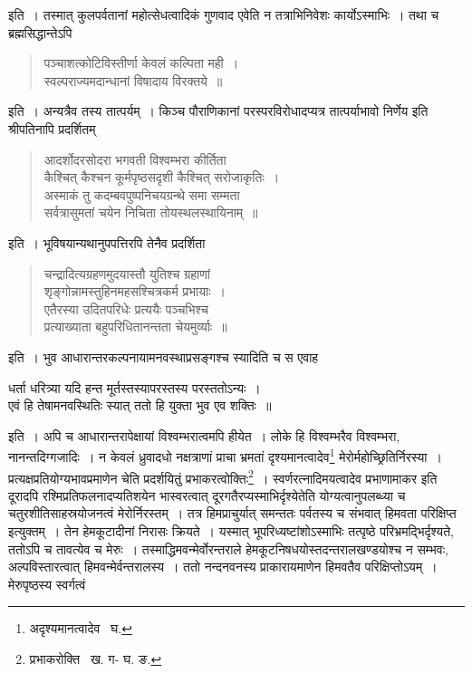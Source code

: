 \documentclass[11pt, openany]{book}
\begin{document}
\noindent इति~। तस्मात् कुलपर्वतानां महोत्सेधत्वादिकं गुणवाद एवेति न तत्राभिनिवेशः कार्योऽस्माभिः~। तथा च ब्रह्मसिद्धान्तेऽपि\textendash  
\begin{quote}
{\qt पञ्चाशत्कोटिविस्तीर्णा केवलं कल्पिता मही~। \\
स्वल्पराज्यमदान्धानां विषादाय विरक्तये~॥}
\end{quote}

\noindent इति~। अन्यत्रैव तस्य तात्पर्यम्~। किञ्च पौराणिकानां परस्परविरोधादप्यत्र तात्पर्याभावो निर्णेय इति श्रीपतिनापि प्रदर्शितम्\textendash 


\newpage

\begin{quote}
{\qt आदर्शोदरसोदरा भगवती विश्वम्भरा कीर्तिता \\
 कैश्चित् कैश्चन कूर्मपृष्ठसदृशी कैश्चित् सरोजाकृतिः~।\\
अस्माकं तु कदम्बवपुष्पनिचयग्रन्थे समा सम्मता\\
सर्वत्रासुमतां चयेन निचिता तोयस्थलस्थायिनाम्~॥}  
\end{quote}

\noindent इति~। भूविषयान्यथानुपपत्तिरपि तेनैव प्रदर्शिता\textendash  

\begin{quote}
{\qt चन्द्रादित्यग्रहणमुदयास्तौ युतिश्च ग्रहाणां \\
 शृङ्गोन्नामस्तुहिनमहसश्चित्रकर्म प्रभायाः~। \\
एतैरस्या उदितपरिधेः प्रत्ययैः पञ्चभिश्च \\
प्रत्याख्याता बहुपरिधितानन्तता चेयमुर्व्याः~॥} 
\end{quote}

इति~। भुव आधारान्तरकल्पनायामनवस्थाप्रसङ्गश्च स्यादिति च स एवाह\textendash  
\begin{center}
{\qt धर्ता धरित्र्या यदि हन्त मूर्तस्तस्यापरस्तस्य परस्ततोऽन्यः~।\\
एवं हि तेषामनवस्थितिः स्यात् ततो हि युक्ता भुव एव शक्तिः~॥}
\end{center}

इति~। अपि च आधारान्तरापेक्षायां विश्वम्भरात्वमपि हीयेत~। लोके हि विश्वम्भरैव विश्वम्भरा, नानन्तदिग्गजादिः~। न केवलं ध्रुवादधो 
नक्षत्राणां प्राचा भ्रमतां दृश्यमानत्वादेव\renewcommand{\thefootnote}{१}\footnote{अदृश्यमानत्वादेव \textendash\ घ.} मेरोर्महोच्छ्रितिर्निरस्या~। प्रत्यक्षप्रतियोग्यभावप्रमाणेन चेति प्रदर्शयितुं प्रभाकरत्वोक्तिः\renewcommand{\thefootnote}{२}\footnote{प्रभाकरोक्ति \textendash\ ख. ग- घ. ङ.}~। स्वर्णरत्नादिमयत्वादेव प्रभाणामाकर इति दूरादपि रश्मिप्रतिफलनादप्यतिशयेन भास्वरत्वात् दूरगतैरप्यस्माभिर्दृश्येतेति योग्यत्वानुपलब्ध्या च चतुरशीतिसाहस्रयोजनत्वं मेरोर्निरस्तम्~। तत्र हिमप्राचुर्यात् समन्ततः पर्वतस्य च संभवात् हिमवता परिक्षिप्त इत्युक्तम्~। तेन हेमकूटादीनां निरासः क्रियते~। यस्मात् भूपरिध्यष्टांशोऽस्माभिः तत्पृष्ठे परिभ्रमद्भिर्दृश्यते, ततोऽपि च तावत्येव च मेरुः~। तस्माद्धिमवन्मेर्वोरन्तराले हेमकूटनिषधयोस्तदन्तरालखण्डयोश्च न सम्भवः, अल्पविस्तारत्वात् हिमवन्मेर्वन्तरालस्य~। ततो नन्दनवनस्य प्राकारायमाणेन हिमवतैव परिक्षिप्तोऽयम्~। मेरुपृष्ठस्य स्वर्गत्वं 
\end{document}
